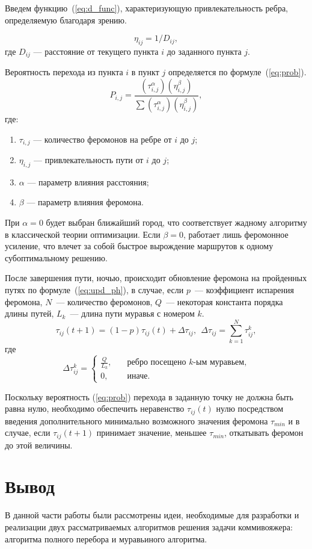 Введем функцию~(\ref{eq:d_func}), характеризующую привлекательность ребра, определяемую благодаря зрению.

\begin{equation}
	\label{eq:d_func}
	\eta_{ij} = 1 / D_{ij},
\end{equation}
где $D_{ij}$ — расстояние от текущего пункта $i$ до заданного пункта $j$.

Вероятность перехода из пункта $i$ в пункт $j$ определяется по формуле~(\ref{eq:prob}).
\begin{equation}
	\label{eq:prob}
	P_{i,j}={\frac {(\tau_{i,j}^{\alpha})(\eta_{i,j}^{\beta })}{\sum (\tau_{i,j}^{\alpha})(\eta_{i,j}^{\beta})}},
\end{equation}
где:
\begin{enumerate}
	\item $\tau_{i,j}$ --- количество феромонов на ребре от $i$ до $j$;
	\item $\eta_{i,j}$ --- привлекательность пути от $i$ до $j$;
	\item $\alpha$ --- параметр влияния расстояния;
	\item $\beta$ --- параметр влияния феромона.
\end{enumerate}

При $\alpha = 0$ будет выбран ближайший город, что соответствует жадному алгоритму в классической теории оптимизации. Если $\beta=0$, работает лишь феромонное усиление, что влечет за собой быстрое вырождение маршрутов к одному субоптимальному решению.

После завершения пути, ночью, происходит обновление феромона на пройденных путях по формуле~(\ref{eq:upd_ph}), в случае, если $p$~--- коэффициент испарения феромона, $N$~--- количество феромонов, $Q$~--- некоторая константа порядка длины путей, $L_{k}$~--- длина пути муравья с номером $k$.
\begin{equation}\label{eq:upd_ph}
	\tau_{ij}(t+1) = (1-p)\tau_{ij}(t) + \Delta \tau_{ij},~~\Delta \tau_{ij} =
	\displaystyle\sum_{k=1}^N \tau^k_{ij},
\end{equation}
где
\begin{equation}\label{eq:3}
	\Delta \tau^k_{ij} = \begin{cases}
		\frac{Q}{L_k}, & \quad \textrm{ребро посещено $k$-ым муравьем,} \\
		0, & \quad \textrm{иначе.}
	\end{cases}
\end{equation}

Поскольку вероятность (\ref{eq:prob}) перехода в заданную точку не должна быть равна нулю, необходимо обеспечить неравенство $\tau_{ij} (t)$ нулю посредством введения дополнительного минимально возможного значения феромона $\tau_{min}$ и в случае, если $\tau_{ij} (t+1)$ принимает значение, меньшее $\tau_{min}$, откатывать феромон до этой величины.

\section*{Вывод}
В данной части работы были рассмотрены идеи, необходимые для разработки и реализации двух рассматриваемых алгоритмов решения задачи коммивояжера: алгоритма полного перебора и муравьиного алгоритма.
